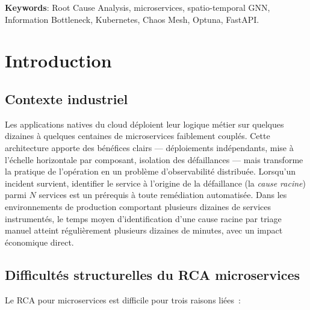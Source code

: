 \documentclass[a4paper,11pt,oneside]{report}
\begin{document}
\vspace{0.5cm}
\textbf{Keywords}: Root Cause Analysis, microservices, spatio-temporal GNN, Information Bottleneck, Kubernetes, Chaos Mesh, Optuna, FastAPI.

\tableofcontents
\listoffigures
\listoftables

\cleardoublepage
{}

\chapter{Introduction}
\label{chap:introduction}

\section{Contexte industriel}
\label{sec:contexte}

Les applications natives du cloud d\'eploient leur logique m\'etier sur quelques dizaines \`a quelques centaines de microservices faiblement coupl\'es. Cette architecture apporte des b\'en\'efices clairs --- d\'eploiements ind\'ependants, mise \`a l'\'echelle horizontale par composant, isolation des d\'efaillances --- mais transforme la pratique de l'op\'eration en un probl\`eme d'observabilit\'e distribu\'ee. Lorsqu'un incident survient, identifier le service \`a l'origine de la d\'efaillance (la \emph{cause racine}) parmi $N$ services est un pr\'erequis \`a toute rem\'ediation automatis\'ee. Dans les environnements de production comportant plusieurs dizaines de services instrument\'es, le temps moyen d'identification d'une cause racine par triage manuel atteint r\'eguli\`erement plusieurs dizaines de minutes, avec un impact \'economique direct.

\section{Difficult\'es structurelles du RCA microservices}
\label{sec:difficultes}

Le RCA pour microservices est difficile pour trois raisons li\'ees~:
\end{document}
